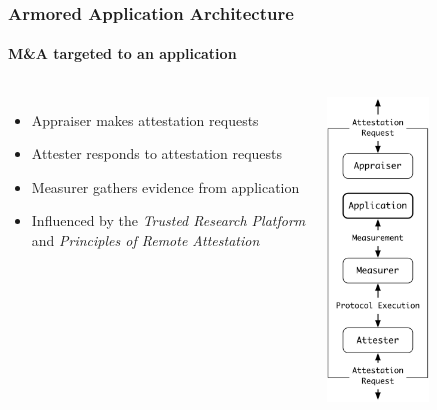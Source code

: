 \documentclass{beamer}
\begin{document}
\begin{frame}
  \frametitle{Armored Application Architecture}
  \framesubtitle{M\&A targeted to an application}
  \begin{columns}[c]
    \begin{itemize}
    \item Appraiser makes attestation requests
    \item Attester responds to attestation requests
    \item Measurer gathers evidence from application
    \item Influenced by the \emph{Trusted Research Platform} and
      \emph{Principles of Remote Attestation}
    \end{itemize}
    \begin{center}
    \includegraphics[width=0.55\textwidth]{figures/architecture.pdf}
    \end{center}
  \end{columns}
\end{frame}
\end{document}
